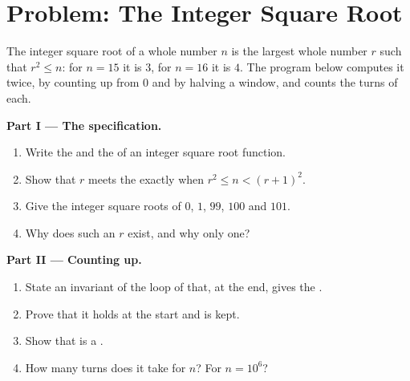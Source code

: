 \section{Problem: The Integer Square Root}\label{sec:g11:proving-algorithms-correct:problem}

\begin{problem}\label{pb:g11:proving-algorithms-correct:1}
The integer square root of a whole number $n$ is the largest whole number $r$ such that $r^2 \le n$: for $n = 15$ it is
$3$, for $n = 16$ it is $4$. The program below computes it twice, by counting up from $0$ and by halving a window, and
counts the turns of each.

\label{lst:g11:proving-algorithms-correct:isqrt}

\label{out:g11:proving-algorithms-correct:isqrt}

\medskip\noindent\textbf{Part I --- The specification.}
\begin{enumerate}
  \item Write the  and the  of an integer square root function.
  \item Show that $r$ meets the  exactly when $r^2 \le n < (r + 1)^2$.
  \item Give the integer square roots of $0$, $1$, $99$, $100$ and $101$.
  \item Why does such an $r$ exist, and why only one?
\end{enumerate}

\medskip\noindent\textbf{Part II --- Counting up.}
\begin{enumerate}[resume]
  \item State an invariant of the loop of  that, at the end, gives the .
  \item Prove that it holds at the start and is kept.
  \item Show that  is a .
  \item How many turns does it take for $n$? For $n = 10^6$?
\end{enumerate}


\end{problem}
